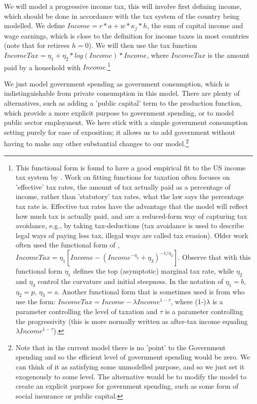 We will model a progressive income tax, this will involve first defining income, which should be done in accordance with the tax system of the country being modelled. We define $Income=r*a+w*\kappa_j*h$, the sum of capital income and wage earnings, which is close to the definition for income taxes in most countries (note that for retirees $h=0$). We will then use the tax function $IncomeTax=\eta_1+\eta_2*log(Income)*Income$, where $IncomeTax$ is the amount paid by a household with $Income$.\footnote{This functional form is found to have a good empirical fit to the US income tax system by \cite*{GunerKaygusuvVentura2014}. Work on fitting functions for taxation often focuses on 'effective' tax rates, the amount of tax actually paid as a percentage of income, rather than 'statutory' tax rates, what the law says the percentage tax rate is. Effective tax rates have the advantage that the model will reflect how much tax is actually paid, and are a reduced-form way of capturing tax avoidance, e.g., by taking tax-deductions (tax avoidance is used to describe legal ways of paying less tax, illegal ways are called tax evasion). Older work often used the functional form of \cite*{GouveiaStrauss1994,GouveiaStrauss1999}, $IncomeTax = \eta_1 \left[Income-(Income^{-\eta_2}+\eta_3)^{-1/\eta_2}\right]$. Observe that with this functional form $\eta_1$ defines the top (asymptotic) marginal tax rate, while $\eta_2$ and $\eta_3$ control the curvature and initial steepness. In the notation of \cite*{GouveiaStrauss1999} $\eta_1=b$, $\eta_2=p$, $\eta_3=s$. Another functional form that is sometimes used is from \cite*{HeathcoteStoreslettenViolante2014} who use the form: $IncomeTax=Income-\lambda Income^{1-\tau}$, where (1-)$\lambda$ is a parameter controlling the level of taxation and $\tau$ is a parameter controlling the progressivity (this is more normally written as after-tax income equaling $\lambda Income^{1-\tau}$).}

We just model government spending as government consumption, which is indistinguishable from private consumption in this model. There are plenty of alternatives, such as adding a 'public capital' term to the production function, which provide a more explicit purpose to government spending, or to model public sector employment. We here stick with a simple government consumption setting purely for ease of exposition; it allows us to add government without having to make any other substantial changes to our model.\footnote{Note that in the current model there is no 'point' to the Government spending and so the efficient level of government spending would be zero. We can think of it as satisfying some unmodelled purpose, and so we just set it exogenously to some level. The alternative would be to modify the model to create an explicit purpose for government spending, such as some form of social insurance or public capital.}

